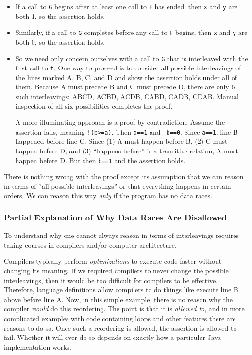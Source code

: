 \documentclass[10pt]{article}
\begin{document}
\begin{itemize}
\item If a call to {\tt G} begins after at least one call to {\tt F}
  has ended, then {\tt x} and {\tt y} are both 1, so the assertion
  holds.
\item Similarly, if a call to {\tt G} completes before any call to
  {\tt F} begins, then {\tt x} and {\tt y} are both 0, so the
  assertion holds.
\item So we need only concern ourselves with a call to {\tt G} that is
  interleaved with the first call to {\tt f}.  One way to proceed is
  to consider all possible interleavings of the lines marked A, B, C,
  and D and show the assertion holds under all of them.  Because A
  must precede B and C must precede D, there are only 6 such
  interleavings: ABCD, ACBD, ACDB, CABD, CADB, CDAB.  Manual
  inspection of all six possibilities completes the proof.  
  
  A more illuminating approach is a proof by contradiction: Assume the
  assertion fails, meaning {\tt !(b>=a)}.  Then {\tt a==1} and {\tt
    b==0}.  Since {\tt a==1}, line B happened before line C\@.  Since
  (1) A must happen before B, (2) C must happen before D, and (3) ``happens
  before'' is a transitive relation, A must happen before D\@.  But
  then {\tt b==1} and the assertion holds.
\end{itemize}

There is nothing wrong with the proof except its assumption that we can
reason in terms of ``all possible interleavings'' or that everything
happens in certain orders.  We can reason this way \emph{only} if the
program has no data races.

\subsubsection{Partial Explanation of Why Data Races Are Disallowed}
\label{sec:data-race-why}

To understand why one cannot always reason in terms of interleavings
requires taking courses in compilers and/or computer architecture.

Compilers typically perform \emph{optimizations} to execute code
faster without changing its meaning.  If we required compilers to
never change the possible interleavings, then it would be too
difficult for compilers to be effective.  Therefore, language
definitions allow compilers to do things like execute line B above
before line A.  Now, in this simple example, there is no reason why
the compiler \emph{would} do this reordering.  The point is that it is
\emph{allowed to}, and in more complicated examples with code
containing loops and other features there are reasons to do so.  Once
such a reordering is allowed, the assertion is allowed to fail.
Whether it will ever do so depends on exactly how a particular Java
implementation works.
\end{document}
